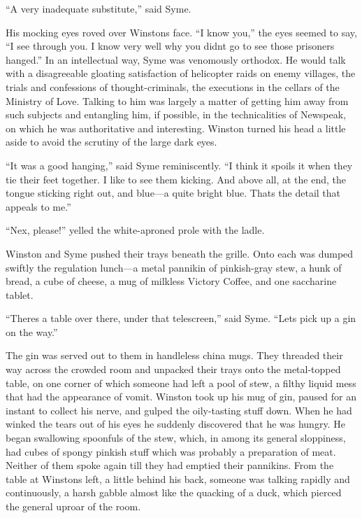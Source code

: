 ``A very inadequate substitute,'' said Syme.

His mocking eyes roved over Winston\textquotesingle s face. ``I know
you,'' the eyes seemed to say, ``I see through you. I know very well why
you didn\textquotesingle t go to see those prisoners hanged.'' In an
intellectual way, Syme was venomously orthodox. He would talk with a
disagreeable gloating satisfaction of helicopter raids on enemy
villages, the trials and confessions of thought-criminals, the
executions in the cellars of the Ministry of Love. Talking to him was
largely a matter of getting him away from such subjects and entangling
him, if possible, in the technicalities of Newspeak, on which he was
authoritative and interesting. Winston turned his head a little aside to
avoid the scrutiny of the large dark eyes.

``It was a good hanging,'' said Syme reminiscently. ``I think it spoils it
when they tie their feet together. I like to see them kicking. And above
all, at the end, the tongue sticking right out, and blue---a quite
bright blue. That\textquotesingle s the detail that appeals to me.''

``Nex\textquotesingle, please!'' yelled the white-aproned prole with the
ladle.

Winston and Syme pushed their trays beneath the grille. Onto each was
dumped swiftly the regulation lunch---a metal pannikin of pinkish-gray
stew, a hunk of bread, a cube of cheese, a mug of milkless Victory
Coffee, and one saccharine tablet.

``There\textquotesingle s a table over there, under that telescreen,''
said Syme. ``Let\textquotesingle s pick up a gin on the way.''

The gin was served out to them in handleless china mugs. They threaded
their way across the crowded room and unpacked their trays onto the
metal-topped table, on one corner of which someone had left a pool of
stew, a filthy liquid mess that had the appearance of vomit. Winston
took up his mug of gin, paused for an instant to collect his nerve, and
gulped the oily-tasting stuff down. When he had winked the tears out of
his eyes he suddenly discovered that he was hungry. He began swallowing
spoonfuls of the stew, which, in among its general sloppiness, had cubes
of spongy pinkish stuff which was probably a preparation of meat.
Neither of them spoke again till they had emptied their pannikins. From
the table at Winston\textquotesingle s left, a little behind his back,
someone was talking rapidly and continuously, a harsh gabble almost like
the quacking of a duck, which pierced the general uproar of the room.

